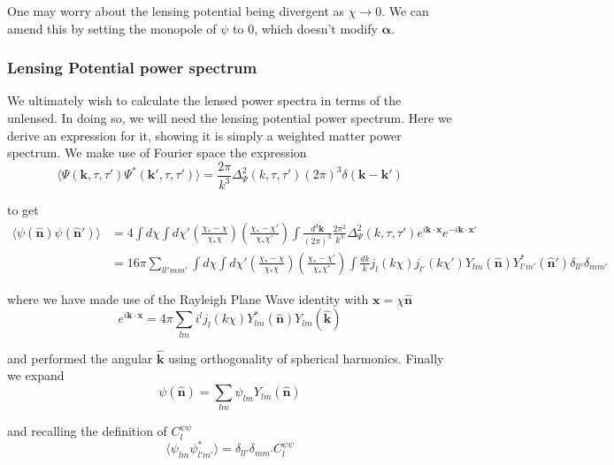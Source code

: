\documentclass[a4paper,10pt]{article}
\renewcommand{\v}[1]{\mathbf{#1}}
\newcommand{\fint}[1]{\int \frac{d^3 \v{#1}}{(2\pi)^3}}
\newcommand{\unit}[1]{\hat{\v{#1}}}
\begin{document}
One may worry about the lensing potential being divergent as $\chi \rightarrow 0$. We can amend this by setting the monopole of $\psi$ to 0, which doesn't modify $\v{\alpha}$. 

\subsubsection{Lensing Potential power spectrum}

We ultimately wish to calculate the lensed power spectra in terms of the unlensed. In doing so, we will need the lensing potential power spectrum. Here we derive an expression for it, showing it is simply a weighted matter power spectrum. We make use of Fourier space the expression
\begin{equation}
\langle \Psi(\v{k},\tau,\tau')\Psi^*(\v{k}',\tau,\tau')\rangle=\frac{2\pi}{k^3}\Delta^2_\Psi(k,\tau,\tau')(2\pi)^3\delta(\v{k}-\v{k}')
\end{equation}

to get 
\begin{equation}\begin{split}
\langle \psi(\unit{n})\psi(\unit{n}') \rangle &= 4\int d\chi \int d\chi'(\frac{\chi_*-\chi}{\chi_*\chi})(\frac{\chi_*-\chi'}{\chi_*\chi'})\fint{k}\frac{2\pi^2}{k^3}\Delta^2_\Psi(k,\tau,\tau')e^{i\v{k}\cdot\v{x}}e^{-i\v{k}\cdot\v{x'}}\\
&= 16\pi \sum_{ll'mm'}\int d\chi \int d\chi'(\frac{\chi_*-\chi}{\chi_*\chi})(\frac{\chi_*-\chi'}{\chi_*\chi'})\int \frac{dk}{k}j_l(k\chi)j_{l'}(k\chi')Y_{lm}(\unit{n})Y^*_{l'm'}(\unit{n}')\delta_{ll'}\delta_{mm'}
\end{split}\end{equation}

where we have made use of the Rayleigh Plane Wave identity with $\v{x}=\chi\unit{n}$
\begin{equation}
e^{i\v{k}\cdot\v{x}} = 4\pi\sum_{lm}i^lj_l(k\chi)Y_{lm}^*(\unit{n})Y_{lm}(\unit{k})
\end{equation}

and performed the angular $\unit{k}$ using orthogonality of spherical harmonics. Finally we expand
\begin{equation}
\psi(\unit{n}) = \sum_{lm}\psi_{lm}Y_{lm}(\unit{n})
\end{equation}

and recalling the definition of $C_l^{\psi\psi}$
\begin{equation}
\langle \psi_{lm}\psi_{l'm'}^* \rangle = \delta_{ll'}\delta_{mm'}C_l^{\psi\psi}
\end{equation}
\end{document}
